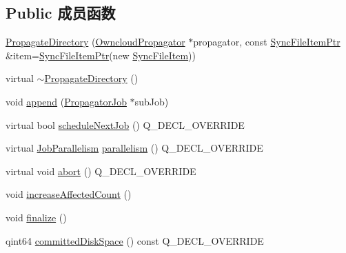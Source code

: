 \subsection*{Public 成员函数}
\begin{DoxyCompactItemize}
\item 
\hyperlink{class_o_c_c_1_1_propagate_directory_a3f78598b8a214007c308bc20f857a69f}{Propagate\+Directory} (\hyperlink{class_o_c_c_1_1_owncloud_propagator}{Owncloud\+Propagator} $\ast$propagator, const \hyperlink{namespace_o_c_c_acb6b0db82893659fbd0c98d3c5b8e2b8}{Sync\+File\+Item\+Ptr} \&item=\hyperlink{namespace_o_c_c_acb6b0db82893659fbd0c98d3c5b8e2b8}{Sync\+File\+Item\+Ptr}(new \hyperlink{class_o_c_c_1_1_sync_file_item}{Sync\+File\+Item}))
\item 
virtual \hyperlink{class_o_c_c_1_1_propagate_directory_a49b5ee6c9b180a513b43bbe9c02e9df4}{$\sim$\+Propagate\+Directory} ()
\item 
void \hyperlink{class_o_c_c_1_1_propagate_directory_abaa9fdc3c191246c698072e29dd924d8}{append} (\hyperlink{class_o_c_c_1_1_propagator_job}{Propagator\+Job} $\ast$sub\+Job)
\item 
virtual bool \hyperlink{class_o_c_c_1_1_propagate_directory_af5975e88fdfcbc25241a60c2fc2ef5ef}{schedule\+Next\+Job} () Q\+\_\+\+D\+E\+C\+L\+\_\+\+O\+V\+E\+R\+R\+I\+DE
\item 
virtual \hyperlink{class_o_c_c_1_1_propagator_job_a2527eb0e2b598fc260a2d6449689c156}{Job\+Parallelism} \hyperlink{class_o_c_c_1_1_propagate_directory_ad2a8216e88230c7257a5a09aa7e58647}{parallelism} () Q\+\_\+\+D\+E\+C\+L\+\_\+\+O\+V\+E\+R\+R\+I\+DE
\item 
virtual void \hyperlink{class_o_c_c_1_1_propagate_directory_a73fa8d31abcef1d29a1551c438f1568e}{abort} () Q\+\_\+\+D\+E\+C\+L\+\_\+\+O\+V\+E\+R\+R\+I\+DE
\item 
void \hyperlink{class_o_c_c_1_1_propagate_directory_a08079de774903ef6a89a7df4c9b3cd44}{increase\+Affected\+Count} ()
\item 
void \hyperlink{class_o_c_c_1_1_propagate_directory_a080c821f4a42533c9967385e6f01a4e9}{finalize} ()
\item 
qint64 \hyperlink{class_o_c_c_1_1_propagate_directory_ae5794c246607f879d1715ea94b0d18e1}{committed\+Disk\+Space} () const Q\+\_\+\+D\+E\+C\+L\+\_\+\+O\+V\+E\+R\+R\+I\+DE
\end{DoxyCompactItemize}
